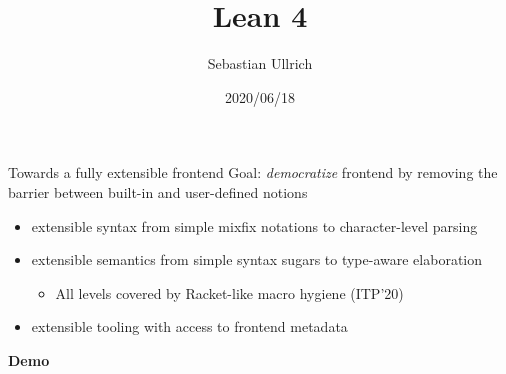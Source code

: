 \documentclass[t]{beamer}
\title{Lean 4}
\author[Ullrich]{Sebastian Ullrich}
\subtitle{\insertauthor}
\institute[IPD Snelting]{Programming paradigms group - IPD Snelting}
\date{2020/06/18}
\begin{document}
\begin{frame}{Towards a fully extensible frontend}
  Goal: \emph{democratize} frontend by removing the barrier between built-in and user-defined notions
  \vfill\pause
  \begin{itemize}
  \item extensible syntax from simple mixfix notations to character-level parsing
    \vfill\pause
  \item extensible semantics from simple syntax sugars to type-aware elaboration
    \begin{itemize}
    \item All levels covered by Racket-like macro hygiene (ITP'20)
    \end{itemize}
    \vfill\pause
  \item extensible tooling with access to frontend metadata
    \vfill
  \end{itemize}
\end{frame}


\begin{frame}
  \vfill
  \begin{center}
    \Huge\textbf{Demo}
  \end{center}
  \vfill
\end{frame}
\end{document}
